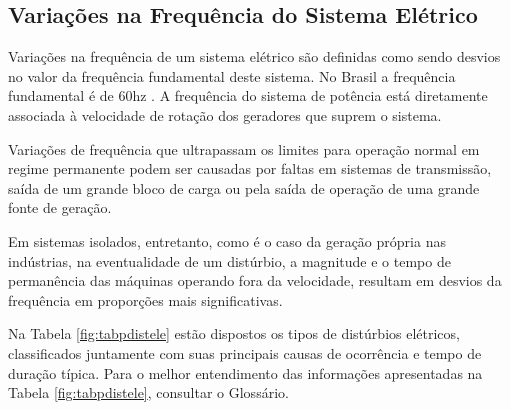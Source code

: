 \subsection{Variações na Frequência do Sistema Elétrico}
\par
Variações na frequência de um sistema elétrico são definidas como sendo desvios no valor da frequência fundamental deste sistema. No Brasil a frequência fundamental é de 60hz \citep{DUG96}. A frequência do sistema de potência está diretamente associada à velocidade de rotação dos geradores que suprem o sistema.
\par
Variações de frequência que ultrapassam os limites para operação normal em regime permanente podem ser causadas por faltas em sistemas de transmissão, saída de um grande bloco de carga ou pela saída de operação de uma grande fonte de geração.
\par
Em sistemas isolados, entretanto, como é o caso da geração própria nas indústrias, na eventualidade de um distúrbio, a magnitude e o tempo de permanência das máquinas operando fora da velocidade, resultam em desvios da frequência em proporções mais significativas.
\par
Na Tabela \ref{fig:tabpdistele} estão dispostos os tipos de distúrbios elétricos, classificados juntamente com suas principais causas de ocorrência e tempo de duração típica. Para o melhor entendimento das informações apresentadas na Tabela \ref{fig:tabpdistele}, consultar o Glossário.

